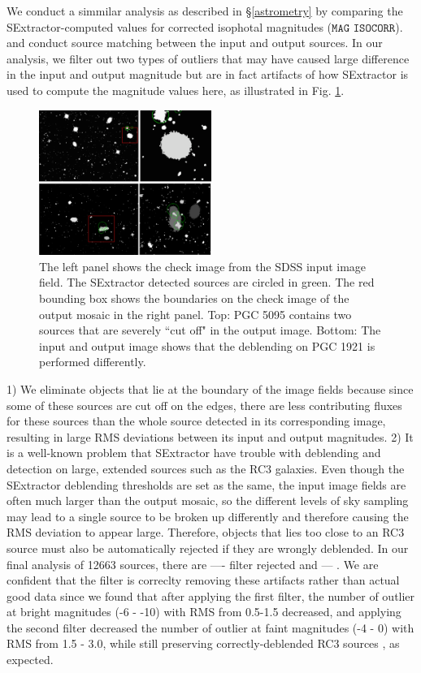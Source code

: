 \documentclass[authoryear, 12pt, 5p, times]{elsarticle}
\begin{document}
We conduct a simmilar analysis as described in \S\ref{astrometry} by comparing the SExtractor-computed values for corrected isophotal magnitudes ($\texttt{MAG ISOCORR}$). and conduct source matching between the input and output sources. In our analysis, we filter out two types of outliers that may have caused large difference in the input and output magnitude but are in fact artifacts of how SExtractor is used to compute the magnitude values here, as illustrated in Fig. \ref{outlier_rejection}.
\begin{figure}[h]
\includegraphics[width=0.5\textwidth]{figures/outlier_rejection.png}
\caption{The left panel shows the check image from the SDSS input image field. The SExtractor detected sources are circled in green. The red bounding box shows the boundaries on the check image of the output mosaic in the right panel. Top: PGC 5095 contains two sources that are severely ``cut off" in the output image. Bottom:  The input and output image shows that the deblending on PGC 1921 is performed differently.}
\label{outlier_rejection}
\end{figure}
 
1) We eliminate objects that lie at the boundary of the image fields because since some of these sources are cut off on the edges, there are less contributing fluxes for these sources than the whole source detected in its corresponding image, resulting in large RMS deviations between its input and output magnitudes.
2)  It is a well-known problem that SExtractor have trouble with deblending and detection on large, extended sources such as the RC3 galaxies. Even though the SExtractor deblending thresholds are set as the same, the input image fields are often much larger than the output mosaic, so the different levels of sky sampling may lead to a single source to be broken up differently and therefore causing the RMS deviation to appear large. Therefore, objects that lies too close to an RC3 source must also be automatically rejected if they are wrongly deblended.
In our final analysis of 12663 sources, there are ---- filter rejected and --- . We are confident that the filter is correclty removing these artifacts rather than actual good data since we found that after applying the first filter,  the number of outlier at bright magnitudes (-6 - -10) with RMS from 0.5-1.5 decreased, and applying the second filter decreased the number of outlier at faint magnitudes (-4 - 0) with RMS from 1.5 - 3.0, while still preserving correctly-deblended RC3 sources , as expected. 
\end{document}
